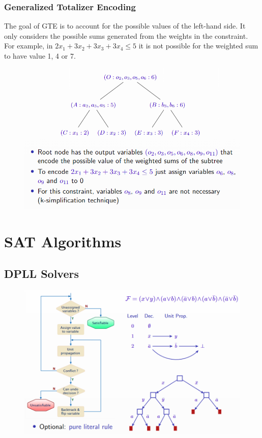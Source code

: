 \documentclass[10pt,a4paper]{report}
\begin{document}
\subsubsection{Generalized Totalizer Encoding}
The goal of GTE  is to account for the possible values of the left-hand side. It only considers the possible sums generated from the weights in the constraint. For example, in $2x_1 + 3x_2 + 3x_3 + 3x_4 \leq 5$ it is not possible for the weighted sum to have value 1, 4 or 7.
\begin{figure}[H]
    \centering
    \includegraphics[scale=0.5]{20.png}
\end{figure}

\section{SAT Algorithms}
\subsection{DPLL Solvers}
\begin{figure}[H]
    \centering
    \includegraphics[scale=0.5]{4.png}
\end{figure}
\end{document}
